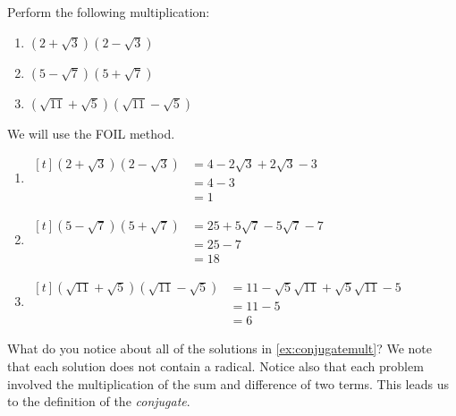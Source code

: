 \begin{myexample}\label{ex:conjugatemult}
Perform the following multiplication:
\begin{multicols}{3}
	\begin{enumerate}
		\item $(2+\sqrt{3})(2-\sqrt{3})$
		\item $(5-\sqrt{7})(5+\sqrt{7})$
		\item $(\sqrt{11}+\sqrt{5})(\sqrt{11}-\sqrt{5})$
	\end{enumerate} 
\end{multicols}
\end{myexample}
\begin{myProof}
	We will use the FOIL method.
	\begin{enumerate}
		\item $
		\begin{aligned}[t]
			(2+\sqrt{3})(2-\sqrt{3}) & =  4 - 2\sqrt{3} + 2\sqrt{3} -3 \\
			                         & =  4-3                          \\
			                         & =  1                            
		\end{aligned}
		$
		\item $
		\begin{aligned}[t]
			(5-\sqrt{7})(5+\sqrt{7}) & =  25 + 5\sqrt{7} - 5\sqrt{7} -7 \\
			                         & =  25 -7                         \\
			                         & =  18                            
		\end{aligned}
		$
		\item $
		\begin{aligned}[t]
			(\sqrt{11}+\sqrt{5})(\sqrt{11}-\sqrt{5}) & =  11 -\sqrt{5}\sqrt{11} +\sqrt{5}\sqrt{11} - 5 \\
			                                         & =  11-5                                         \\
			                                         & =  6                                            
		\end{aligned}
		$
	\end{enumerate} 
\end{myProof} 

What do you notice about all of the solutions in \cref{ex:conjugatemult}? We note that each \gls{solution} does 
not contain a radical. Notice also that each problem involved the multiplication of the sum and difference of 
two terms. This leads us to the definition of the {\em conjugate}.

